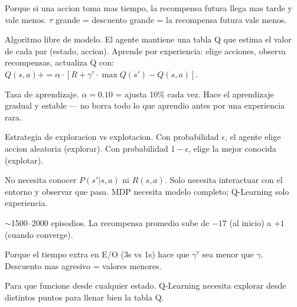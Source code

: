 \documentclass[11pt,a4paper]{article}
\begin{document}
\begin{pregunta}
Porque si una accion toma mas tiempo, la recompensa futura llega mas tarde y vale menos. $\tau$ grande = descuento grande = la recompensa futura vale menos.
\end{pregunta}

\begin{pregunta}
Algoritmo libre de modelo. El agente mantiene una tabla Q que estima el valor de cada par (estado, accion). Aprende por experiencia: elige acciones, observa recompensas, actualiza Q con: $Q(s,a) += \alpha \cdot [R + \gamma^\tau \cdot \max Q(s') - Q(s,a)]$.
\end{pregunta}

\begin{pregunta}
Tasa de aprendizaje. $\alpha = 0.10$ = ajusta 10\% cada vez. Hace el aprendizaje gradual y estable — no borra todo lo que aprendio antes por una experiencia rara.
\end{pregunta}

\begin{pregunta}
Estrategia de exploracion vs explotacion. Con probabilidad $\epsilon$, el agente elige accion aleatoria (explorar). Con probabilidad $1-\epsilon$, elige la mejor conocida (explotar).
\end{pregunta}

\begin{pregunta}
No necesita conocer $P(s'|s,a)$ ni $R(s,a)$. Solo necesita interactuar con el entorno y observar que pasa. MDP necesita modelo completo; Q-Learning solo experiencia.
\end{pregunta}

\begin{pregunta}
$\sim$1500--2000 episodios. La recompensa promedio sube de $-17$ (al inicio) a $+1$ (cuando converge).
\end{pregunta}

\begin{pregunta}
Porque el tiempo extra en E/O (3s vs 1s) hace que $\gamma^\tau$ sea menor que $\gamma$. Descuento mas agresivo = valores menores.
\end{pregunta}

\begin{pregunta}
Para que funcione desde cualquier estado. Q-Learning necesita explorar desde distintos puntos para llenar bien la tabla Q.
\end{pregunta}
\end{document}
